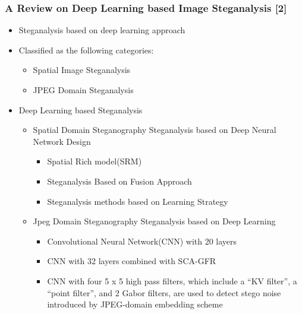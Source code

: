 \documentclass{beamer} %
\theoremstyle{definition} %
\begin{document}
\begin{frame}
\frametitle{A Review on Deep Learning based Image Steganalysis [2]   }
\begin{itemize}
	\item{Steganalysis based on deep learning approach  }
	\item{Classified as the following categories:}
	\begin{itemize}
		\item Spatial Image Steganalysis 
		\item JPEG Domain  Steganalysis  
	\end{itemize}
\end{itemize}
\begin{itemize}
	 \item{Deep Learning based Steganalysis  }
	\begin{itemize}
		\item {Spatial Domain Steganography Steganalysis based on Deep Neural Network Design  }
		\begin{itemize}
			\item Spatial Rich model(SRM)  
			\item Steganalysis Based on Fusion Approach 
			\item Steganalysis methods based on Learning Strategy
		\end{itemize}
	    \item{ Jpeg Domain Steganography Steganalysis based on Deep
	    	Learning  }
    	\begin{itemize}
    		\item Convolutional Neural Network(CNN) with 20 layers 
    		\item CNN with 32 layers combined with  SCA-GFR 
    		\item CNN with four 5 x 5 high pass filters, which
    		include a “KV filter”, a “point filter”, and 2 Gabor filters, are
    		used to detect stego noise introduced by JPEG-domain
    		embedding scheme 
    	\end{itemize}
	\end{itemize}
\end{itemize}
\end{frame}
\end{document}

